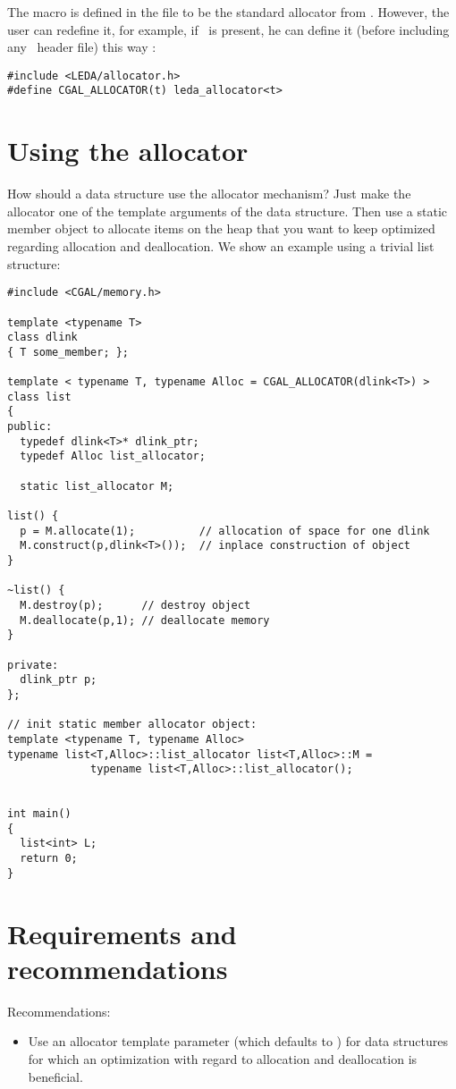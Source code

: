 The macro 
is defined in the file  to be the standard allocator
from .
However, the user can redefine it, for example, if \leda\ is present,
he can define it (before including any \cgal\ header file) this way :

\begin{verbatim}
#include <LEDA/allocator.h>
#define CGAL_ALLOCATOR(t) leda_allocator<t>
\end{verbatim}

\section{Using the allocator\label{sec:using_memory_allocator}}

How should a data structure use the allocator mechanism? Just make the
allocator one of the template arguments of the data structure. Then
use a static member object to allocate items on the heap that you
want to keep optimized regarding allocation and deallocation. We
show an example using a trivial list structure:

\begin{verbatim}
#include <CGAL/memory.h>

template <typename T> 
class dlink 
{ T some_member; };

template < typename T, typename Alloc = CGAL_ALLOCATOR(dlink<T>) >
class list 
{
public:
  typedef dlink<T>* dlink_ptr;
  typedef Alloc list_allocator;

  static list_allocator M;

list() {
  p = M.allocate(1);          // allocation of space for one dlink
  M.construct(p,dlink<T>());  // inplace construction of object
}

~list() {
  M.destroy(p);      // destroy object
  M.deallocate(p,1); // deallocate memory
}

private:
  dlink_ptr p;
};

// init static member allocator object:
template <typename T, typename Alloc>
typename list<T,Alloc>::list_allocator list<T,Alloc>::M =
             typename list<T,Alloc>::list_allocator();


int main()
{
  list<int> L;
  return 0;
}
\end{verbatim}

\section{Requirements and recommendations\label{sec:memory_req_and_rec}}

\noindent
Recommendations:
\begin{itemize}
   \item Use an allocator template parameter (which defaults to
         ) for data structures for which an optimization
         with regard to allocation and deallocation is beneficial.
\end{itemize}

